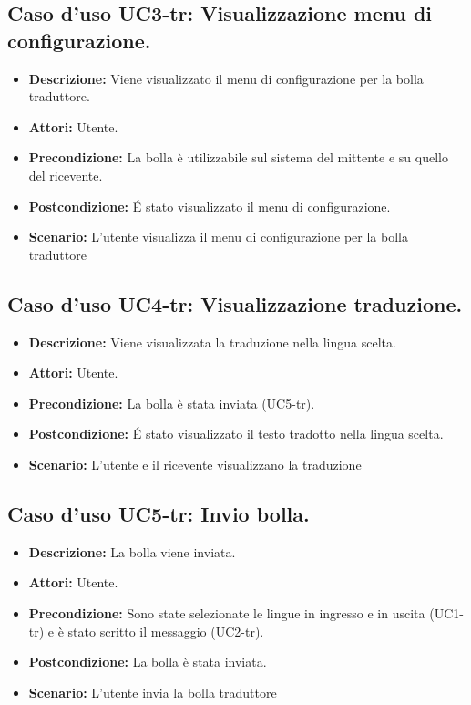 \subsection{Caso d'uso UC3-tr: Visualizzazione menu di configurazione.}
\begin{itemize}
\item[]\textbf{Descrizione:} Viene visualizzato il menu di configurazione per la bolla traduttore.
\item[]\textbf{Attori:} Utente. 
\item[]\textbf{Precondizione:} La bolla è utilizzabile sul sistema del mittente e su quello del ricevente. 
\item[]\textbf{Postcondizione:} \'E stato visualizzato il menu di configurazione. 
\item[]\textbf{Scenario:}
L'utente visualizza il menu di configurazione per la bolla traduttore 
\end{itemize}

\subsection{Caso d'uso UC4-tr: Visualizzazione traduzione.}
\begin{itemize}
\item[]\textbf{Descrizione:} Viene visualizzata la traduzione nella lingua scelta.
\item[]\textbf{Attori:} Utente. 
\item[]\textbf{Precondizione:} La bolla è stata inviata (UC5-tr). 
\item[]\textbf{Postcondizione:} \'E stato visualizzato il testo tradotto nella lingua scelta. 
\item[]\textbf{Scenario:}
L'utente e il ricevente visualizzano la traduzione 
\end{itemize}

\subsection{Caso d'uso UC5-tr: Invio bolla.}
\begin{itemize}
\item[]\textbf{Descrizione:} La bolla viene inviata.
\item[]\textbf{Attori:} Utente. 
\item[]\textbf{Precondizione:} Sono state selezionate le lingue in ingresso e in uscita (UC1-tr) e è stato scritto il messaggio (UC2-tr). 
\item[]\textbf{Postcondizione:} La bolla è stata inviata. 
\item[]\textbf{Scenario:}
L'utente invia la bolla traduttore 
\end{itemize}

